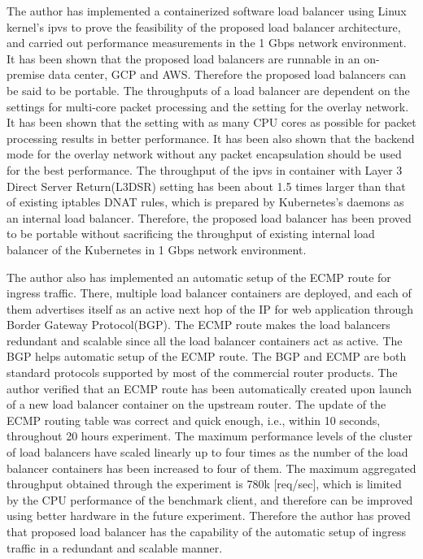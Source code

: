 The author has implemented a containerized software load balancer using Linux kernel's ipvs to prove the feasibility of the proposed load balancer architecture, and carried out performance measurements in the 1 Gbps network environment.
It has been shown that the proposed load balancers are runnable in an on-premise data center, GCP and AWS.
Therefore the proposed load balancers can be said to be portable.
%
The throughputs of a load balancer are dependent on the settings for multi-core packet processing and the setting for the overlay network.
It has been shown that the setting with as many CPU cores as possible for packet processing results in better performance.
It has been also shown that the backend mode for the overlay network without any packet encapsulation should be used for the best performance.
%
The throughput of the ipvs in container with Layer 3 Direct Server Return(L3DSR) setting has been about 1.5 times larger than that of existing iptables DNAT rules, which is prepared by Kubernetes's daemons as an  internal load balancer.
Therefore, the proposed load balancer has been proved to be portable without sacrificing the throughput of existing internal load balancer of the Kubernetes in 1 Gbps network environment.

The author also has implemented an automatic setup of the ECMP route for ingress traffic.
There, multiple load balancer containers are deployed, and each of them advertises itself as an active next hop of the IP for web application through Border Gateway Protocol(BGP).
The ECMP route makes the load balancers redundant and scalable since all the load balancer containers act as active.
The BGP helps automatic setup of the ECMP route.  
The BGP and ECMP are both standard protocols supported by most of the commercial router products.
%
The author verified that an ECMP route has been automatically created upon launch of a new load balancer container on the upstream router.
The update of the ECMP routing table was correct and quick enough, i.e., within 10 seconds, throughout 20 hours experiment.
The maximum performance levels of the cluster of load balancers have scaled linearly up to four times as the number of the load balancer containers has been increased to four of them.
The maximum aggregated throughput obtained through the experiment is 780k [req/sec], which is limited by the CPU performance of the benchmark client, and therefore can be improved using better hardware in the future experiment.
Therefore the author has proved that proposed load balancer has the capability of the automatic setup of ingress traffic in a redundant and scalable manner.

